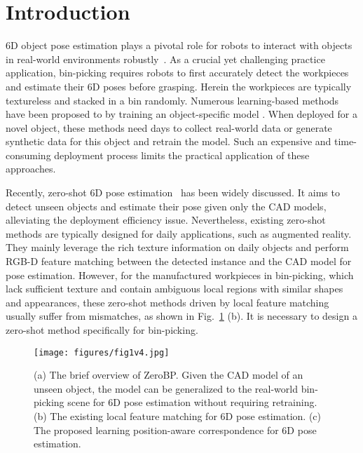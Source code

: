 \section{Introduction}
\label{sec:intro}
%
6D object pose estimation plays a pivotal role for robots to interact with objects in real-world environments robustly~\cite{MVBPICRA, ST6DICRA, st6deccv, robi}. As a crucial yet challenging practice application, bin-picking requires robots to first accurately detect the workpieces and estimate their 6D poses before grasping. Herein the workpieces are typically textureless and stacked in a bin randomly. Numerous learning-based methods~\cite{mpaae, aae, ST6DICRA, st6deccv,miretr, dcnet} have been proposed to  by training an object-specific model . When deployed for a novel object, these methods need days to collect real-world data or generate synthetic data for this object and retrain the model. Such an expensive and time-consuming deployment process limits the practical application of these approaches. 

Recently, zero-shot 6D pose estimation~\cite{chen2023zeropose, sam6d, labbe2022megapose} has been widely discussed. It aims to detect unseen objects and estimate their pose given only the CAD models, alleviating the deployment efficiency issue. Nevertheless, existing zero-shot methods are typically designed for daily applications, such as augmented reality. They mainly leverage the rich texture information on daily objects and perform RGB-D feature matching between the detected instance and the CAD model for pose estimation. However, for the manufactured workpieces in bin-picking, which lack sufficient texture and contain ambiguous local regions with similar shapes and appearances, these zero-shot methods driven by local feature matching usually suffer from mismatches, as shown in Fig.~\ref{fig:fig1} (b). 
 It is necessary to design a zero-shot method specifically for bin-picking.


\begin{figure}[t]
    \centering
    \texttt{[image: figures/fig1v4.jpg]}
    \caption{(a) The brief overview of ZeroBP. Given the CAD model of an unseen object, the model can be generalized to the real-world bin-picking scene for 6D pose estimation without requiring retraining. (b) The existing local feature matching for 6D pose estimation. (c) The proposed learning position-aware correspondence for 6D pose estimation. }
    \label{fig:fig1}
    \vspace{-2mm}
\end{figure}

